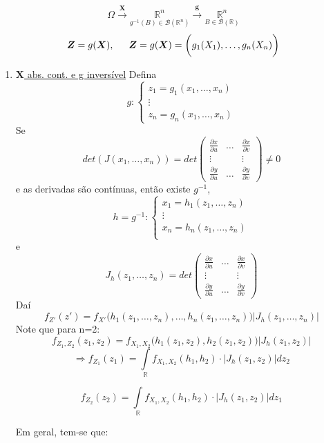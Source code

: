\documentclass[a4paper,12pt]{article}
\begin{document}
	$$\Omega  \overset{\bm X}{\longrightarrow}  
\underset{g^{-1}(B)\in \mathscr{B}(\mathbb{R}^n) }{\mathbb R^n}
\overset{\bm g}{\longrightarrow} 
\underset{B \in \mathscr{B}(\mathbb{R}) }{\mathbb R^n}
$$
	$$\bm Z = g(\bm X), \indent \bm Z = g(\bm X)= \bigg(
	g_1(X_1),\ldots,g_n( X_n)
	\bigg)$$
	
	\begin{enumerate}
		\item \underline{$\bm X$ abs. cont. e g inversível}
		Defina
		$$ g:
		\begin{cases}
		z_1=g_1(x_1,\ldots,x_n)\\
		\vdots\\
		z_n = g_n(x_1,\ldots,x_n)
		\end{cases}
		$$
		Se $$
		det(J(x_1,\ldots,x_n))=det\begin{pmatrix}
			\frac{\partial x}{\partial u}&\ldots &\frac{\partial x}{\partial v}  \\
			\vdots & &\vdots\\
			\frac{\partial y}{\partial u}&\ldots & \frac{\partial y}{\partial v}  
			\end{pmatrix}\ne 0$$
			e as derivadas são contínuas, então existe $g^{-1}$,
			$$h=g^{-1}:\begin{cases}
			x_1=h_1(z_1,\ldots,z_n)\\
			\vdots\\
						x_n=h_n(z_1,\ldots,z_n)\\
			
			\end{cases} $$
			e
$$J_h(z_1,\ldots,z_n)=
det\begin{pmatrix}
\frac{\partial x}{\partial u}&\ldots &\frac{\partial x}{\partial v}  \\
\vdots & &\vdots\\
\frac{\partial y}{\partial u}&\ldots & \frac{\partial y}{\partial v}  
\end{pmatrix}
 $$
 Daí
 $$f_{Z'}(z')=f_{X'}\bigg(h_1(z_1,\ldots,z_n),\ldots,h_n(z_1,\ldots,z_n)\bigg)\bigg|
 J_h(z_1,\ldots,z_n)
 \bigg| $$
			Note que para n=2:
			$$f_{Z_1,Z_2}(z_1,z_2)=
			f_{X_1,X_2}\bigg(
			h_1(z_1,z_2),h_2(z_1,z_2)
			\bigg)\bigg|
			J_h(z_1,z_2)
			\bigg|
			 $$
			$$\Rightarrow
			f_{Z_1}(z_1)= \int\limits_{\mathbb R} f_{X_1,X_2}(h_1,h_2)\cdot \bigg|
			J_h(z_1,z_2)
			\bigg|dz_2
			 $$
			 
			 $$
			 			f_{Z_2}(z_2)= \int\limits_{\mathbb R} f_{X_1,X_2}(h_1,h_2)\cdot \bigg|
			 J_h(z_1,z_2)
			 \bigg|dz_1
			 $$
			 
			 Em geral, tem-se que:
			 

\end{enumerate}
\end{document}
